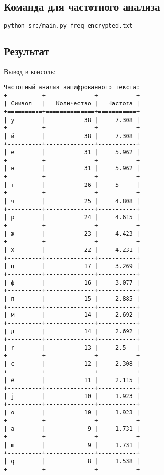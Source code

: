 \documentclass[a4paper, 14pt]{report}
\begin{document}
\subsection{Команда для частотного анализа}
\begin{lstlisting}[language=bash]
python src/main.py freq encrypted.txt
\end{lstlisting}

\subsection{Результат}
Вывод в консоль:
\begin{lstlisting}[frame=false]
Частотный анализ зашифрованного текста:
+----------+--------------+-----------+
| Символ   |   Количество |   Частота |
+==========+==============+===========+
| у        |           38 |     7.308 |
+----------+--------------+-----------+
| й        |           38 |     7.308 |
+----------+--------------+-----------+
| е        |           31 |     5.962 |
+----------+--------------+-----------+
| н        |           31 |     5.962 |
+----------+--------------+-----------+
| т        |           26 |     5     |
+----------+--------------+-----------+
| ч        |           25 |     4.808 |
+----------+--------------+-----------+
| р        |           24 |     4.615 |
+----------+--------------+-----------+
| ж        |           23 |     4.423 |
+----------+--------------+-----------+
| х        |           22 |     4.231 |
+----------+--------------+-----------+
| ц        |           17 |     3.269 |
+----------+--------------+-----------+
| ф        |           16 |     3.077 |
+----------+--------------+-----------+
| п        |           15 |     2.885 |
+----------+--------------+-----------+
| м        |           14 |     2.692 |
+----------+--------------+-----------+
| д        |           14 |     2.692 |
+----------+--------------+-----------+
| r        |           13 |     2.5   |
+----------+--------------+-----------+
| с        |           12 |     2.308 |
+----------+--------------+-----------+
| ё        |           11 |     2.115 |
+----------+--------------+-----------+
| j        |           10 |     1.923 |
+----------+--------------+-----------+
| о        |           10 |     1.923 |
+----------+--------------+-----------+
| а        |            9 |     1.731 |
+----------+--------------+-----------+
| ш        |            9 |     1.731 |
+----------+--------------+-----------+
| q        |            8 |     1.538 |
+----------+--------------+-----------+

\end{lstlisting}
\end{document}
